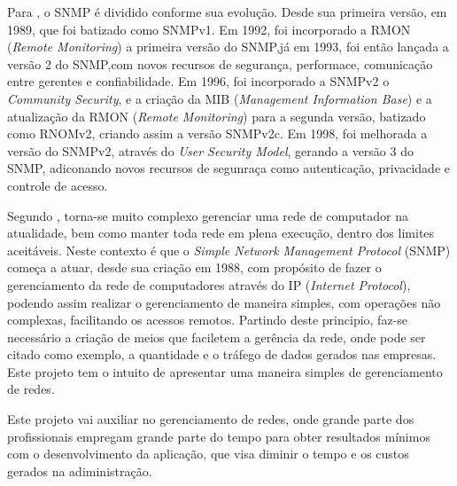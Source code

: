 \par Para , o  SNMP é dividido conforme sua
evolução. Desde sua primeira versão, em 1989, que foi batizado como SNMPv1. Em
1992, foi incorporado a RMON (\textit{Remote Monitoring}) a primeira versão do
SNMP,já em 1993, foi então lançada a versão 2 do SNMP,com novos recursos de
segurança, performace, comunicação entre gerentes e confiabilidade. Em 1996, foi
incorporado a SNMPv2 o \textit{Community Security}, 
e a criação da MIB (\textit{Management Information Base}) e a atualização da
RMON (\textit{Remote Monitoring}) para a segunda versão, batizado como RNOMv2,
criando assim a versão SNMPv2c. Em 1998, foi melhorada a versão do SNMPv2,
através do \textit{User Security Model}, gerando a versão 3 do SNMP, adiconando novos recursos de segunraça como
autenticação, privacidade e controle de acesso.

\par Segundo , torna-se muito complexo
gerenciar uma rede de computador na atualidade, bem como manter toda 
rede em plena execução, dentro dos limites aceitáveis. 
Neste contexto é que o \textit{Simple Network Management Protocol} (SNMP) 
começa a atuar, desde sua criação em 1988, com propósito de fazer o 
gerenciamento da rede de computadores através do IP  
(\textit{Internet Protocol}), podendo assim realizar
o gerenciamento de maneira simples, com operações não complexas, 
facilitando os acessos remotos. Partindo deste principio, faz-se 
necessário a criação de meios que faciletem a gerência da rede, onde pode ser
citado como exemplo, a quantidade e o tráfego de dados gerados nas empresas. 
Este projeto tem o intuito de apresentar 
uma maneira simples de gerenciamento de redes.


\par Este projeto vai auxiliar no gerenciamento de redes, onde
grande parte dos profissionais empregam grande parte do tempo para obter resultados mínimos com o
desenvolvimento da aplicação, que visa diminir o tempo e os custos gerados na adiministração.



